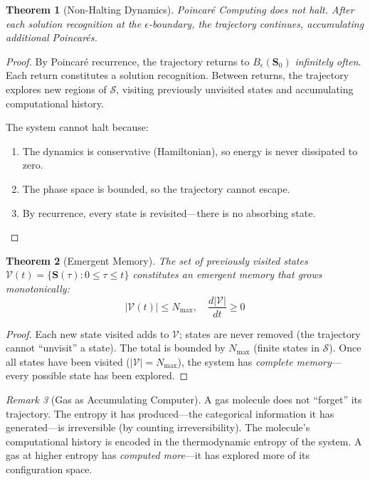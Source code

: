 \documentclass[twocolumn,10pt,a4paper]{article}
\theoremstyle{plain}
\newtheorem{theorem}{Theorem}[section]
\theoremstyle{definition}
\theoremstyle{remark}
\newtheorem{remark}[theorem]{Remark}
\newcommand{\Sspace}{\mathcal{S}}
\newcommand{\Scoord}{\mathbf{S}}
\begin{document}
\begin{theorem}[Non-Halting Dynamics]
\label{thm:non_halting}
Poincar\'{e} Computing does not halt. After each solution recognition at the $\epsilon$-boundary, the trajectory continues, accumulating additional Poincar\'{e}s.
\end{theorem}

\begin{proof}
By Poincar\'{e} recurrence, the trajectory returns to $B_\epsilon(\Scoord_0)$ \emph{infinitely often}. Each return constitutes a solution recognition. Between returns, the trajectory explores new regions of $\Sspace$, visiting previously unvisited states and accumulating computational history.

The system cannot halt because:
\begin{enumerate}
    \item The dynamics is conservative (Hamiltonian), so energy is never dissipated to zero.
    \item The phase space is bounded, so the trajectory cannot escape.
    \item By recurrence, every state is revisited---there is no absorbing state.
\end{enumerate}
\end{proof}

\begin{theorem}[Emergent Memory]
\label{thm:memory}
The set of previously visited states $\mathcal{V}(t) = \{\Scoord(\tau) : 0 \leq \tau \leq t\}$ constitutes an emergent memory that grows monotonically:
\begin{equation}
    |\mathcal{V}(t)| \leq N_{\max}, \quad \frac{d|\mathcal{V}|}{dt} \geq 0
\end{equation}
\end{theorem}

\begin{proof}
Each new state visited adds to $\mathcal{V}$; states are never removed (the trajectory cannot ``unvisit'' a state). The total is bounded by $N_{\max}$ (finite states in $\Sspace$). Once all states have been visited ($|\mathcal{V}| = N_{\max}$), the system has \emph{complete memory}---every possible state has been explored.
\end{proof}

\begin{remark}[Gas as Accumulating Computer]
A gas molecule does not ``forget'' its trajectory. The entropy it has produced---the categorical information it has generated---is irreversible (by counting irreversibility). The molecule's computational history is encoded in the thermodynamic entropy of the system. A gas at higher entropy has \emph{computed more}---it has explored more of its configuration space.
\end{remark}
\end{document}
